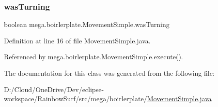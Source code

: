 \subsubsection{\texorpdfstring{was\+Turning}{wasTurning}}
{\footnotesize\ttfamily boolean mega.\+boirlerplate.\+Movement\+Simple.\+was\+Turning\hspace{0.3cm}{\ttfamily [private]}}



Definition at line 16 of file Movement\+Simple.\+java.



Referenced by mega.\+boirlerplate.\+Movement\+Simple.\+execute().



The documentation for this class was generated from the following file\+:\begin{DoxyCompactItemize}
\item 
D\+:/\+Cloud/\+One\+Drive/\+Dev/eclipse-\/workspace/\+Rainbow\+Surf/src/mega/boirlerplate/\hyperlink{_movement_simple_8java}{Movement\+Simple.\+java}\end{DoxyCompactItemize}
